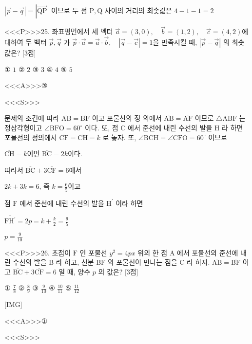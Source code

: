 \documentclass{oblivoir}
\begin{document}
$|\overrightarrow{p}-\overrightarrow{q}|=|\overrightarrow{\mathrm{QP}}|$ 이므로 두 점 $\mathrm{P}, \mathrm{Q}$ 사이의 거리의 최솟값은 $4-1-1=2$


<<<P>>>25. 좌표평면에서 세 벡터 $\overrightarrow{a}=(3,0), \quad \overrightarrow{b}=(1,2), \quad \overrightarrow{c}=(4,2)$에 대하여 두 벡터 $\overrightarrow{p}, \overrightarrow{q}$ 가
$\overrightarrow{p} \cdot \overrightarrow{a}=\overrightarrow{a} \cdot \overrightarrow{b}, \quad|\overrightarrow{q}-\overrightarrow{c}|=1$을 만족시킬 때, $|\overrightarrow{p}-\overrightarrow{q}|$ 의 최솟값은? [3점]

① $1$
② $2$
③ $3$
④ $4$
⑤ $5$



<<<A>>>③

<<<S>>>



문제의 조건에 따라 $\overline{\mathrm{AB}}=\overline{\mathrm{BF}}$ 이고 포물선의 정 의에서 $\overline{\mathrm{AB}}=\overline{\mathrm{AF}}$ 이므로 $\triangle \mathrm{ABF}$ 는 정삼각형이고 $\angle \mathrm{BFO}=60^{\circ}$ 이다.
또, 점 $\mathrm{C}$ 에서 준선에 내린 수선의 발을 $\mathrm{H}$ 라 하면 포물선의 정의에서 $\overline{\mathrm{CF}}=\overline{\mathrm{CH}}=k$ 로 놓자.
또, $\angle \mathrm{BCH}=\angle \mathrm{CFO}=60^{\circ}$ 이므로

$\overline{\mathrm{CH}}=k$이면 $\overline{\mathrm{BC}}=2 k$이다.

따라서 $\overline{\mathrm{BC}}+3 \overline{\mathrm{CF}}=6$에서

$2 k+3 k=6$, 즉 $k=\frac{6}{5}$이고

점 $\mathrm{F}$ 에서 준선에 내린 수선의 발을 $\mathrm{H}^{\prime}$ 이라 하면

$\overline{\mathrm{FH}^{\prime}}=2 p=k+\frac{k}{2}=\frac{9}{5}$

$p=\frac{9}{10}$


<<<P>>>26. 초점이 $\mathrm{F}$ 인 포물선 $y^{2}=4 p x$ 위의 한 점 $\mathrm{A}$ 에서 포물선의 준선에 내린 수선의 발을 $\mathrm{B}$ 라 하고, 선분 $\mathrm{BF}$ 와 포물선이 만나는 점을 $\mathrm{C}$ 라 하자. $\overline{\mathrm{AB}}=\overline{\mathrm{BF}}$ 이고 $\overline{\mathrm{BC}}+3 \overline{\mathrm{CF}}=6$ 일 때, 양수 $p$ 의 값은? [3점]

① $\frac{7}{8}$
② $\frac{8}{9}$
③ $\frac{9}{10}$
④ $\frac{10}{11}$
⑤ $\frac{11}{12}$


[IMG]


<<<A>>>①

<<<S>>>
\end{document}
